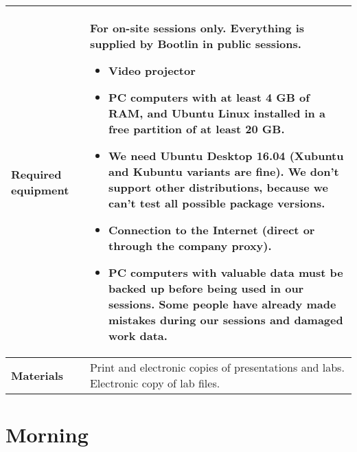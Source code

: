 \documentclass[a4paper,12pt,obeyspaces,spaces,hyphens]{article}
\begin{document}
{  \begin{tabularx}{\textwidth}{|g|h|}
    {\bf Required equipment} &
    {\bf For on-site sessions only.}
    \newline Everything is supplied by Bootlin in public
    sessions.
    \begin{itemize}
    \item Video projector
    \item PC computers with at least 4 GB of RAM, and Ubuntu Linux
    installed in a {\bf free partition of at least 20 GB}.
    \item We need Ubuntu Desktop 16.04 (Xubuntu and
    Kubuntu variants are fine). We don't support other
    distributions, because we can't test all possible package versions.
    \item {\bf Connection to the Internet} (direct or through the
    company proxy).
    \item {\bf PC computers with valuable data must be backed up}
    before being used in our sessions.  Some people have already made
    mistakes during our sessions and damaged work data.
    \end{itemize}\\
    \hline

    {\bf Materials} & Print and electronic copies of presentations and
    labs.
    \newline Electronic copy of lab files.\\
    \hline

\end{tabularx}}
\normalsize

\section{Morning}
\end{document}
